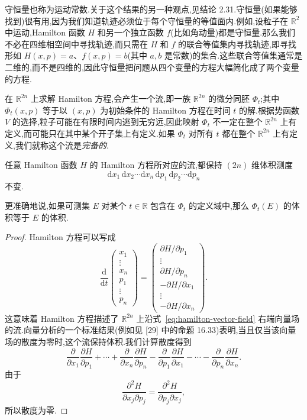 守恒量也称为运动常数.关于这个结果的另一种观点,见结论 2.31.守恒量(如果能够找到)很有用,因为我们知道轨迹必须位于每个守恒量的等值面内.例如,设粒子在 $\mathbb{R}^{2}$ 中运动,Hamilton 函数 $H$ 和另一个独立函数 $f$(比如角动量)都是守恒量.那么我们不必在四维相空间中寻找轨迹,而只需在 $H$ 和 $f$ 的联合等值集内寻找轨迹,即寻找形如 $H(x,p)=a$、$f(x,p)=b$(其中 $a,b$ 是常数)的集合.这些联合等值集通常是二维的,而不是四维的,因此守恒量把问题从四个变量的方程大幅简化成了两个变量的方程.

在 $\mathbb{R}^{2n}$ 上求解 Hamilton 方程,会产生一个流,即一族 $\mathbb{R}^{2n}$ 的微分同胚 $\Phi_{t}$;其中 $\Phi_{t}(x,p)$ 等于以 $(x,p)$ 为初始条件的 Hamilton 方程在时间 $t$ 的解.根据势函数 $V$ 的选择,粒子可能在有限时间内逃到无穷远,因此映射 $\Phi_{t}$ 不一定在整个 $\mathbb{R}^{2n}$ 上有定义,而可能只在其中某个开子集上有定义.如果 $\Phi_{t}$ 对所有 $t$ 都在整个 $\mathbb{R}^{2n}$ 上有定义,我们就称这个流是\emph{完备的}.

\begin{theorem}[Liouville 定理]\label{thm:liouville}
任意 Hamilton 函数 $H$ 的 Hamilton 方程所对应的流,都保持 $(2n)$ 维体积测度
\[
  \mathrm{d}x_{1}\,\mathrm{d}x_{2}\cdots\mathrm{d}x_{n}\,\mathrm{d}p_{1}\,\mathrm{d}p_{2}\cdots\mathrm{d}p_{n}
\]
不变.

更准确地说,如果可测集 $E$ 对某个 $t\in\mathbb{R}$ 包含在 $\Phi_{t}$ 的定义域中,那么 $\Phi_{t}(E)$ 的体积等于 $E$ 的体积.
\end{theorem}

\begin{proof}
Hamilton 方程可以写成
\begin{equation}
\frac{\mathrm{d}}{\mathrm{d}t}
\begin{pmatrix}
 x_{1}\\ \vdots\\ x_{n}\\ p_{1}\\ \vdots\\ p_{n}
\end{pmatrix}
=
\begin{pmatrix}
 \partial H/\partial p_{1}\\ \vdots\\ \partial H/\partial p_{n}\\
 -\partial H/\partial x_{1}\\ \vdots\\ -\partial H/\partial x_{n}
\end{pmatrix}.
\label{eq:hamilton-vector-field}
\end{equation}
这意味着 Hamilton 方程描述了 $\mathbb{R}^{2n}$ 上沿式~\eqref{eq:hamilton-vector-field} 右端向量场的流.向量分析的一个标准结果(例如见 [29] 中的命题 16.33)表明,当且仅当该向量场的散度为零时,这个流保持体积.我们计算散度得到
\[
  \frac{\partial}{\partial x_{1}}\frac{\partial H}{\partial p_{1}}+\cdots+\frac{\partial}{\partial x_{n}}\frac{\partial H}{\partial p_{n}}
  -\frac{\partial}{\partial p_{1}}\frac{\partial H}{\partial x_{1}}-\cdots-\frac{\partial}{\partial p_{n}}\frac{\partial H}{\partial x_{n}}.
\]
由于
\[
  \frac{\partial^{2}H}{\partial x_{j}\partial p_{j}}
  =\frac{\partial^{2}H}{\partial p_{j}\partial x_{j}},
\]
所以散度为零.
\end{proof}

